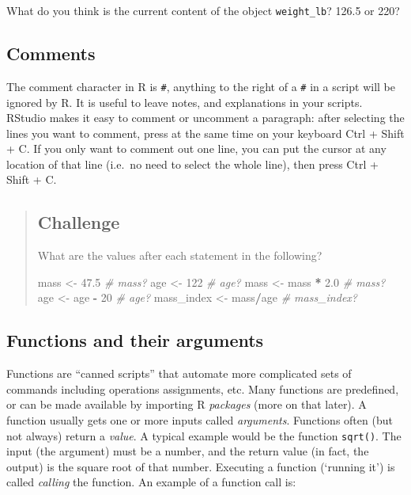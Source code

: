 \documentclass[]{book}
\newenvironment{Shaded}{\begin{snugshade}}{\end{snugshade}}
\newcommand{\DecValTok}[1]{\textcolor[rgb]{0.00,0.00,0.81}{#1}}
\newcommand{\FloatTok}[1]{\textcolor[rgb]{0.00,0.00,0.81}{#1}}
\newcommand{\StringTok}[1]{\textcolor[rgb]{0.31,0.60,0.02}{#1}}
\newcommand{\CommentTok}[1]{\textcolor[rgb]{0.56,0.35,0.01}{\textit{#1}}}
\newcommand{\OperatorTok}[1]{\textcolor[rgb]{0.81,0.36,0.00}{\textbf{#1}}}
\newcommand{\NormalTok}[1]{#1}
\begin{document}
What do you think is the current content of the object
\texttt{weight\_lb}? 126.5 or 220?

\subsection{Comments}\label{comments}

The comment character in R is \texttt{\#}, anything to the right of a
\texttt{\#} in a script will be ignored by R. It is useful to leave
notes, and explanations in your scripts. RStudio makes it easy to
comment or uncomment a paragraph: after selecting the lines you want to
comment, press at the same time on your keyboard Ctrl + Shift + C. If
you only want to comment out one line, you can put the cursor at any
location of that line (i.e.~no need to select the whole line), then
press Ctrl + Shift + C.

\begin{quote}
\subsection{Challenge}\label{challenge}

What are the values after each statement in the following?

\begin{Shaded}
\begin{Highlighting}[]
\NormalTok{mass <-}\StringTok{ }\FloatTok{47.5}            \CommentTok{# mass?}
\NormalTok{age  <-}\StringTok{ }\DecValTok{122}             \CommentTok{# age?}
\NormalTok{mass <-}\StringTok{ }\NormalTok{mass }\OperatorTok{*}\StringTok{ }\FloatTok{2.0}      \CommentTok{# mass?}
\NormalTok{age  <-}\StringTok{ }\NormalTok{age }\OperatorTok{-}\StringTok{ }\DecValTok{20}        \CommentTok{# age?}
\NormalTok{mass_index <-}\StringTok{ }\NormalTok{mass}\OperatorTok{/}\NormalTok{age  }\CommentTok{# mass_index?}
\end{Highlighting}
\end{Shaded}
\end{quote}

\subsection{Functions and their
arguments}\label{functions-and-their-arguments}

Functions are ``canned scripts'' that automate more complicated sets of
commands including operations assignments, etc. Many functions are
predefined, or can be made available by importing R \emph{packages}
(more on that later). A function usually gets one or more inputs called
\emph{arguments}. Functions often (but not always) return a
\emph{value}. A typical example would be the function \texttt{sqrt()}.
The input (the argument) must be a number, and the return value (in
fact, the output) is the square root of that number. Executing a
function (`running it') is called \emph{calling} the function. An
example of a function call is:
\end{document}
